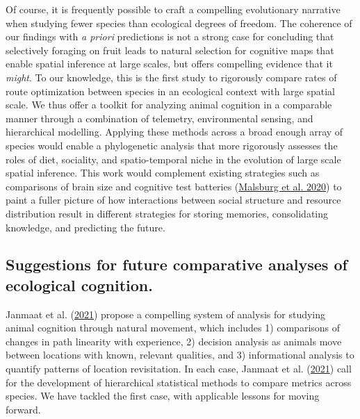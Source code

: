 \documentclass[twoside,12pt,final]{ucthesis-CA2012}
\begin{document}
\begin{ucmainmatter}
Of course, it is frequently possible to craft a compelling evolutionary narrative when studying fewer species than ecological degrees of freedom. The coherence of our findings with \emph{a priori} predictions is not a strong case for concluding that selectively foraging on fruit leads to natural selection for cognitive maps that enable spatial inference at large scales, but offers compelling evidence that it \emph{might}. To our knowledge, this is the first study to rigorously compare rates of route optimization between species in an ecological context with large spatial scale. We thus offer a toolkit for analyzing animal cognition in a comparable manner through a combination of telemetry, environmental sensing, and hierarchical modelling. Applying these methods across a broad enough array of species would enable a phylogenetic analysis that more rigorously assesses the roles of diet, sociality, and spatio-temporal niche in the evolution of large scale spatial inference. This work would complement existing strategies such as comparisons of brain size and cognitive test batteries (\protect\hyperlink{ref-malsburg2020}{Malsburg et al. 2020}) to paint a fuller picture of how interactions between social structure and resource distribution result in different strategies for storing memories, consolidating knowledge, and predicting the future.

\hypertarget{suggestions-for-future-comparative-analyses-of-ecological-cognition.}{%
\subsection{Suggestions for future comparative analyses of ecological cognition.}\label{suggestions-for-future-comparative-analyses-of-ecological-cognition.}}

Janmaat et al. (\protect\hyperlink{ref-janmaat2021}{2021}) propose a compelling system of analysis for studying animal cognition through natural movement, which includes 1) comparisons of changes in path linearity with experience, 2) decision analysis as animals move between locations with known, relevant qualities, and 3) informational analysis to quantify patterns of location revisitation. In each case, Janmaat et al. (\protect\hyperlink{ref-janmaat2021}{2021}) call for the development of hierarchical statistical methods to compare metrics across species. We have tackled the first case, with applicable lessons for moving forward.


\end{ucmainmatter}
\end{document}
